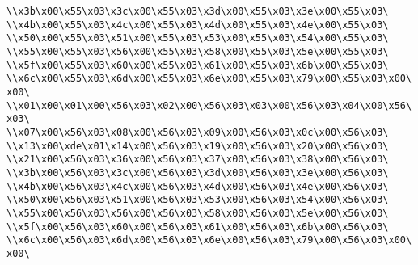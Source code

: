\verb|\\x3b\x00\x55\x03\x3c\x00\x55\x03\x3d\x00\x55\x03\x3e\x00\x55\x03\|\newline
\verb|\\x4b\x00\x55\x03\x4c\x00\x55\x03\x4d\x00\x55\x03\x4e\x00\x55\x03\|\newline
\verb|\\x50\x00\x55\x03\x51\x00\x55\x03\x53\x00\x55\x03\x54\x00\x55\x03\|\newline
\verb|\\x55\x00\x55\x03\x56\x00\x55\x03\x58\x00\x55\x03\x5e\x00\x55\x03\|\newline
\verb|\\x5f\x00\x55\x03\x60\x00\x55\x03\x61\x00\x55\x03\x6b\x00\x55\x03\|\newline
\verb|\\x6c\x00\x55\x03\x6d\x00\x55\x03\x6e\x00\x55\x03\x79\x00\x55\x03\x00\x00\|\newline
\verb|\\x01\x00\x01\x00\x56\x03\x02\x00\x56\x03\x03\x00\x56\x03\x04\x00\x56\x03\|\newline
\verb|\\x07\x00\x56\x03\x08\x00\x56\x03\x09\x00\x56\x03\x0c\x00\x56\x03\|\newline
\verb|\\x13\x00\xde\x01\x14\x00\x56\x03\x19\x00\x56\x03\x20\x00\x56\x03\|\newline
\verb|\\x21\x00\x56\x03\x36\x00\x56\x03\x37\x00\x56\x03\x38\x00\x56\x03\|\newline
\verb|\\x3b\x00\x56\x03\x3c\x00\x56\x03\x3d\x00\x56\x03\x3e\x00\x56\x03\|\newline
\verb|\\x4b\x00\x56\x03\x4c\x00\x56\x03\x4d\x00\x56\x03\x4e\x00\x56\x03\|\newline
\verb|\\x50\x00\x56\x03\x51\x00\x56\x03\x53\x00\x56\x03\x54\x00\x56\x03\|\newline
\verb|\\x55\x00\x56\x03\x56\x00\x56\x03\x58\x00\x56\x03\x5e\x00\x56\x03\|\newline
\verb|\\x5f\x00\x56\x03\x60\x00\x56\x03\x61\x00\x56\x03\x6b\x00\x56\x03\|\newline
\verb|\\x6c\x00\x56\x03\x6d\x00\x56\x03\x6e\x00\x56\x03\x79\x00\x56\x03\x00\x00\|\newline
